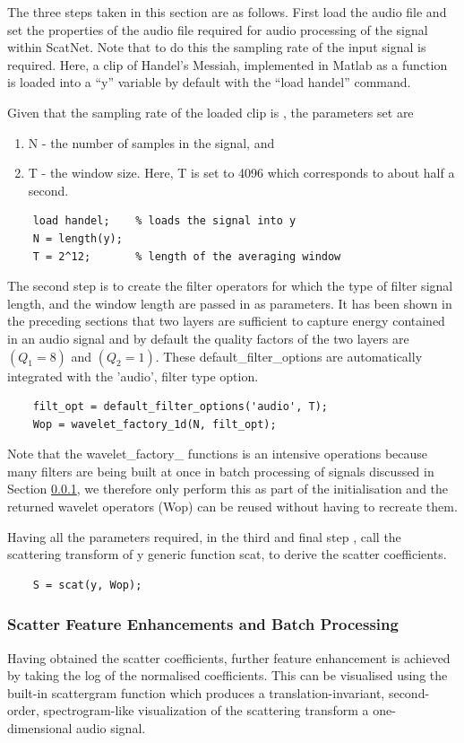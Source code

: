 The three steps taken in this section are as follows.  First load the audio file and set the properties of the audio file required for audio processing of the signal within ScatNet.  Note that to do this the sampling rate of the input signal is required. Here, a clip of Handel’s Messiah, implemented in Matlab as a function is loaded into a “y” variable by default with the “load handel” command.

Given that the sampling rate of the loaded clip is , the parameters set are 
\begin{enumerate}
    \item N - the number of samples in the signal, and  
    \item T - the window size.  Here, T is set to 4096 which corresponds to about half a second.
\end{enumerate}
\begin{verbatim}
    load handel;	% loads the signal into y
    N = length(y);
    T = 2^12;   	% length of the averaging window
\end{verbatim}

The second step is to create the filter operators for which the type of filter signal length, and the window length are passed in as parameters.  It has been shown in the preceding sections that two layers are sufficient to capture energy contained in an audio signal and by default the quality factors of the two layers are $(Q_1 = 8)$ and $(Q_2 = 1)$. These default\_filter\_options are automatically integrated with the 'audio', filter type option.
\begin{verbatim}
    filt_opt = default_filter_options('audio', T);
    Wop = wavelet_factory_1d(N, filt_opt);
\end{verbatim}
Note that the wavelet\_factory\_ functions is an intensive operations because many filters are being built at once  in batch processing of signals discussed in Section \ref{sec_c3_sbatch}, we therefore only perform this as part of the initialisation and the returned wavelet operators (Wop) can be reused without having to recreate them.

Having all the parameters required, in the third and final step , call the scattering transform of y generic function scat, to derive the scatter coefficients.
\begin{verbatim}
    S = scat(y, Wop);
\end{verbatim}

\subsubsection{Scatter Feature Enhancements and Batch Processing}\label{sec_c3_sbatch}
Having obtained the scatter coefficients, further feature enhancement is achieved by taking the log of the normalised coefficients.  This can be visualised using the  built-in scattergram function which produces a translation-invariant, second-order, spectrogram-like visualization of the  scattering transform a one-dimensional audio signal. 


